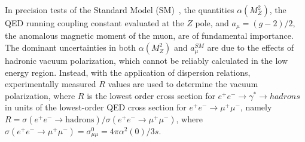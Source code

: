 \date{\today}

\maketitle

\twocolumn[\maketitle\abstract{
We report values of $R = \sigma(e^+e^-\rightarrow
\mbox{hadrons})/\sigma(e^+e^-\rightarrow\mu^+\mu^-)$ for 85
center-of-mass energies between 2 and 5 GeV measured 
with the upgraded Beijing Spectrometer at the Beijing 
Electron-Positron Collider. 
}]


In precision tests of the Standard Model (SM)~\cite{rlowe}, 
the quantities
$\alpha(M_Z^2)$, the QED running coupling constant evaluated at
the $Z$ pole, and $a_\mu = (g-2)/2$, the anomalous magnetic moment
of the muon, are of fundamental importance.
%
%
The dominant uncertainties in both $\alpha(M^2_{Z})$ and $a_{\mu}^{SM}$ are 
due to the effects of hadronic vacuum polarization, which cannot be 
reliably calculated in the low energy region.  Instead, with the 
application of dispersion relations,
experimentally measured $R$ values are used to determine the vacuum 
polarization, where $R$ is the lowest order cross section 
for $e^+e^-\rightarrow\gamma^*\rightarrow hadrons$
in units of the lowest-order QED cross section for
$e^+e^- \rightarrow \mu^+\mu^-$, namely
$R=\sigma(e^+e^- \rightarrow \mbox{hadrons})/\sigma(e^+e^-\rightarrow
\mu^+\mu^-)$, where 
$\sigma (e^+e^- \rightarrow \mu^+\mu^-) = \sigma^0_{\mu \mu}=
4\pi \alpha^2(0) / 3s$.

